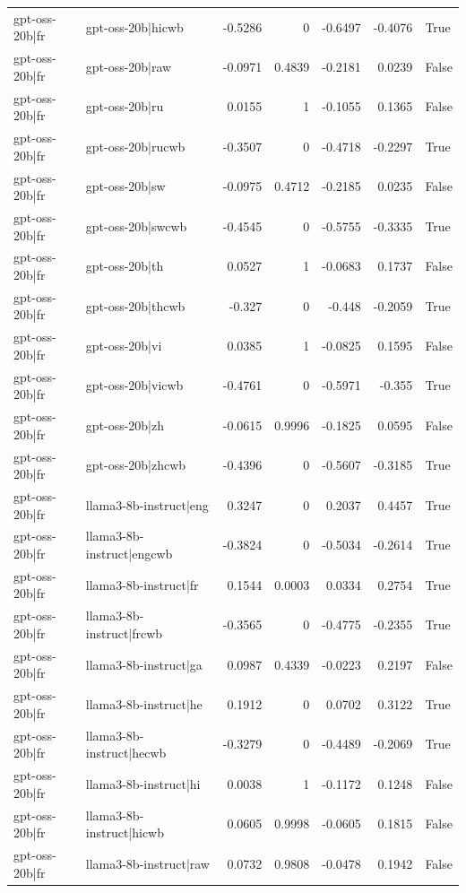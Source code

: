 \begin{table}
\begin{tabular}{l l r r r r l}
gpt-oss-20b|fr & gpt-oss-20b|hicwb & -0.5286 & 0 & -0.6497 & -0.4076 & True \\
gpt-oss-20b|fr & gpt-oss-20b|raw & -0.0971 & 0.4839 & -0.2181 & 0.0239 & False \\
gpt-oss-20b|fr & gpt-oss-20b|ru & 0.0155 & 1 & -0.1055 & 0.1365 & False \\
gpt-oss-20b|fr & gpt-oss-20b|rucwb & -0.3507 & 0 & -0.4718 & -0.2297 & True \\
gpt-oss-20b|fr & gpt-oss-20b|sw & -0.0975 & 0.4712 & -0.2185 & 0.0235 & False \\
gpt-oss-20b|fr & gpt-oss-20b|swcwb & -0.4545 & 0 & -0.5755 & -0.3335 & True \\
gpt-oss-20b|fr & gpt-oss-20b|th & 0.0527 & 1 & -0.0683 & 0.1737 & False \\
gpt-oss-20b|fr & gpt-oss-20b|thcwb & -0.327 & 0 & -0.448 & -0.2059 & True \\
gpt-oss-20b|fr & gpt-oss-20b|vi & 0.0385 & 1 & -0.0825 & 0.1595 & False \\
gpt-oss-20b|fr & gpt-oss-20b|vicwb & -0.4761 & 0 & -0.5971 & -0.355 & True \\
gpt-oss-20b|fr & gpt-oss-20b|zh & -0.0615 & 0.9996 & -0.1825 & 0.0595 & False \\
gpt-oss-20b|fr & gpt-oss-20b|zhcwb & -0.4396 & 0 & -0.5607 & -0.3185 & True \\
gpt-oss-20b|fr & llama3-8b-instruct|eng & 0.3247 & 0 & 0.2037 & 0.4457 & True \\
gpt-oss-20b|fr & llama3-8b-instruct|engcwb & -0.3824 & 0 & -0.5034 & -0.2614 & True \\
gpt-oss-20b|fr & llama3-8b-instruct|fr & 0.1544 & 0.0003 & 0.0334 & 0.2754 & True \\
gpt-oss-20b|fr & llama3-8b-instruct|frcwb & -0.3565 & 0 & -0.4775 & -0.2355 & True \\
gpt-oss-20b|fr & llama3-8b-instruct|ga & 0.0987 & 0.4339 & -0.0223 & 0.2197 & False \\
gpt-oss-20b|fr & llama3-8b-instruct|he & 0.1912 & 0 & 0.0702 & 0.3122 & True \\
gpt-oss-20b|fr & llama3-8b-instruct|hecwb & -0.3279 & 0 & -0.4489 & -0.2069 & True \\
gpt-oss-20b|fr & llama3-8b-instruct|hi & 0.0038 & 1 & -0.1172 & 0.1248 & False \\
gpt-oss-20b|fr & llama3-8b-instruct|hicwb & 0.0605 & 0.9998 & -0.0605 & 0.1815 & False \\
gpt-oss-20b|fr & llama3-8b-instruct|raw & 0.0732 & 0.9808 & -0.0478 & 0.1942 & False \\

\end{tabular}
\end{table}
